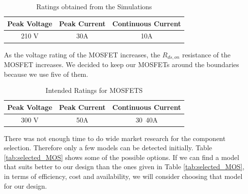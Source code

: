 \begin{table}[ht]
    \centering
        \begin{tabular}{|c|c|c|}
        \hline
         Peak Voltage   & Peak Current    & Continuous Current  \\
         \hline
         210 V          & 30A             & 10A          \\
        \hline
        \end{tabular}
    \caption{Ratings obtained from the Simulations}
    \label{tab:ratings_DC}
\end{table}

As the voltage rating of the MOSFET increases, the $R_{ds,on}$ resistance of the MOSFET increases. We decided to keep our MOSFETs around the boundaries because we use five of them. 

\begin{table}[ht]
    \centering
        \begin{tabular}{|c|c|c|}
        \hline
         Peak Voltage   & Peak Current    & Continuous Current  \\ 
         \hline
         300 V          & 50A          & 30~40A          \\
        \hline
        \end{tabular}
    \caption{Intended Ratings for MOSFETS}
    \label{tab:ratings_MOS}
\end{table}
There was not enough time to do wide market research for the component selection. Therefore only a few models can be detected initially. Table \ref{tab:selected_MOS} shows some of the possible options. If we can find a model that suits better to our design than the ones given in Table \ref{tab:selected_MOS}, in terms of efficiency, cost and availability, we will consider choosing that model for our design. 

